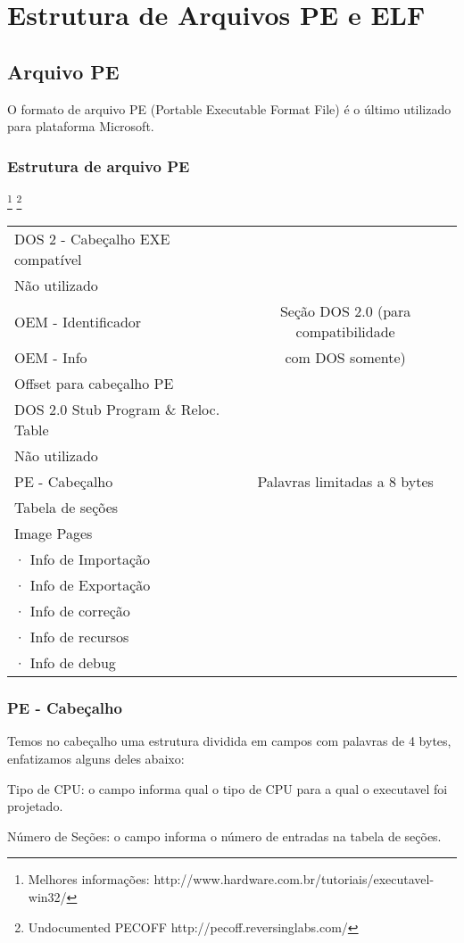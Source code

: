 \chapter{Estrutura de Arquivos PE e ELF}\label{ap:A}

\section{Arquivo PE}

O formato de arquivo PE (Portable Executable Format File) é o último
utilizado para plataforma Microsoft.


\subsection{Estrutura de arquivo PE}\footnote{Melhores informações: http://www.hardware.com.br/tutoriais/executavel-win32/} \footnote{Undocumented PECOFF http://pecoff.reversinglabs.com/}
\begin{list}{}
\item {\begin{tabular}{|l|c|}
\hline 
DOS 2 - Cabeçalho EXE compatível  & \tabularnewline
\cline{1-1} 
Não utilizado  & \tabularnewline
\cline{1-1} 
OEM - Identificador  & Seção DOS 2.0 (para compatibilidade \tabularnewline
OEM - Info  & com DOS somente)\tabularnewline
Offset para cabeçalho PE & \tabularnewline
\cline{1-1} 
DOS 2.0 Stub Program \& Reloc. Table  & \tabularnewline
\hline 
Não utilizado & \tabularnewline
\hline 
PE - Cabeçalho & Palavras limitadas a 8 bytes\tabularnewline
\hline 
Tabela de seções & \tabularnewline
\hline
Image Pages  & \tabularnewline
· Info de Importação & \tabularnewline
· Info de Exportação  & \tabularnewline
· Info de correção & \tabularnewline
· Info de recursos & \tabularnewline
· Info de debug & \tabularnewline
\hline
\end{tabular}}
\end{list}

\subsection{PE - Cabeçalho}


Temos no cabeçalho uma estrutura dividida em campos com palavras
de 4 bytes, enfatizamos alguns deles abaixo:


Tipo de CPU: o campo informa qual o tipo de CPU para a qual o executavel
foi projetado.


Número de Seções: o campo informa o número de entradas na tabela
de seções.


